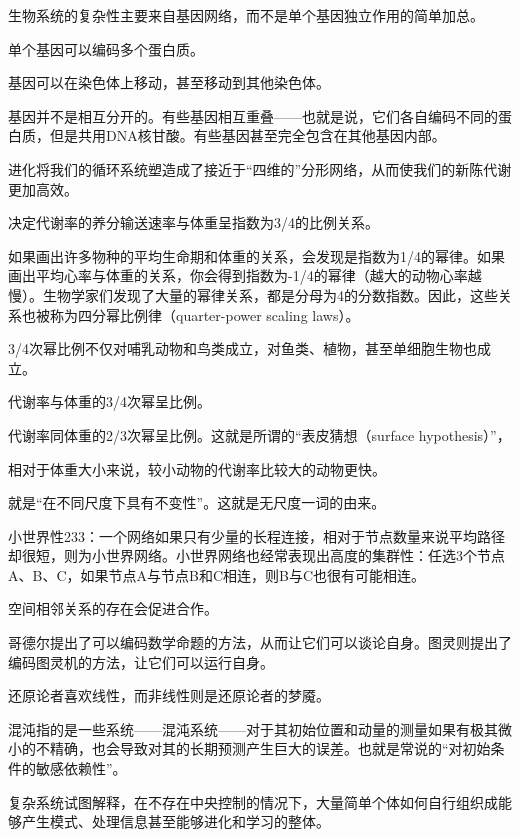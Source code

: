 生物系统的复杂性主要来自基因网络，而不是单个基因独立作用的简单加总。

单个基因可以编码多个蛋白质。

基因可以在染色体上移动，甚至移动到其他染色体。

基因并不是相互分开的。有些基因相互重叠——也就是说，它们各自编码不同的蛋白质，但是共用DNA核甘酸。有些基因甚至完全包含在其他基因内部。

进化将我们的循环系统塑造成了接近于“四维的”分形网络，从而使我们的新陈代谢更加高效。

决定代谢率的养分输送速率与体重呈指数为3/4的比例关系。

如果画出许多物种的平均生命期和体重的关系，会发现是指数为1/4的幂律。如果画出平均心率与体重的关系，你会得到指数为-1/4的幂律（越大的动物心率越慢）。生物学家们发现了大量的幂律关系，都是分母为4的分数指数。因此，这些关系也被称为四分幂比例律（quarter-power scaling laws）。

3/4次幂比例不仅对哺乳动物和鸟类成立，对鱼类、植物，甚至单细胞生物也成立。

代谢率与体重的3/4次幂呈比例。

代谢率同体重的2/3次幂呈比例。这就是所谓的“表皮猜想（surface hypothesis）”，

相对于体重大小来说，较小动物的代谢率比较大的动物更快。

就是“在不同尺度下具有不变性”。这就是无尺度一词的由来。

小世界性233：一个网络如果只有少量的长程连接，相对于节点数量来说平均路径却很短，则为小世界网络。小世界网络也经常表现出高度的集群性：任选3个节点A、B、C，如果节点A与节点B和C相连，则B与C也很有可能相连。

空间相邻关系的存在会促进合作。

哥德尔提出了可以编码数学命题的方法，从而让它们可以谈论自身。图灵则提出了编码图灵机的方法，让它们可以运行自身。

还原论者喜欢线性，而非线性则是还原论者的梦魇。

混沌指的是一些系统——混沌系统——对于其初始位置和动量的测量如果有极其微小的不精确，也会导致对其的长期预测产生巨大的误差。也就是常说的“对初始条件的敏感依赖性”。

复杂系统试图解释，在不存在中央控制的情况下，大量简单个体如何自行组织成能够产生模式、处理信息甚至能够进化和学习的整体。